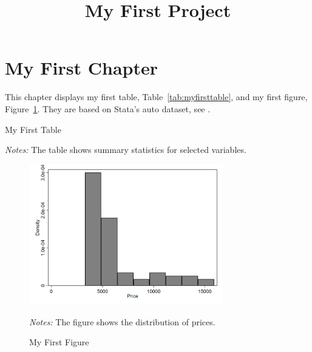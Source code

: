 \documentclass{article}
\title{My First Project}
\author{}
\date{}
\begin{document}
\maketitle

\section{My First Chapter}
This chapter displays my first table, Table~\ref{tab:myfirsttable}, and my first figure, Figure~\ref{fig:myfirstfigure}. They are based on Stata's auto dataset, see \citet{stata_press_datasets_2021}.

\begin{table}[!ht]
\caption{My First Table}
\label{tab:myfirsttable}
\centering
	
\begin{tablenotes}
	\item \emph{Notes:} The table shows summary statistics for selected variables.
\end{tablenotes}
\end{table}

\begin{figure}[!ht]
\caption{My First Figure}
\label{fig:myfirstfigure}
\centering
	\includegraphics[width=0.75\textwidth]{../output/figures/myfirstfigure.png}
\begin{tablenotes}
	\item \emph{Notes:} The figure shows the distribution of prices.
\end{tablenotes}
\end{figure}




\end{document}
